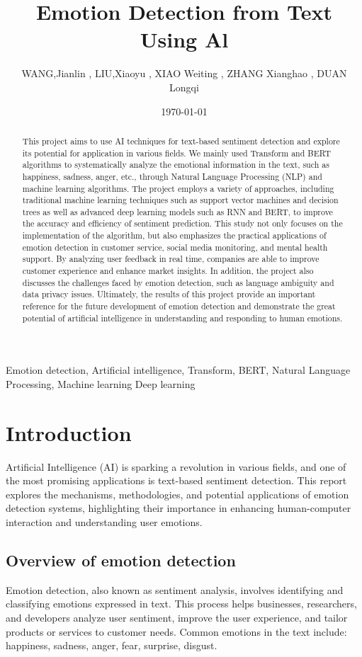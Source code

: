 \documentclass[journal]{IEEEtran}
\title{Emotion Detection from Text Using Al}
\author{WANG,Jianlin , LIU,Xiaoyu , XIAO Weiting , ZHANG Xianghao , DUAN Longqi }
\date{\today}
\begin{document}
\maketitle
\begin{abstract}
This project aims to use AI techniques for text-based sentiment detection and explore its potential for application in various fields. We mainly used Transform and BERT algorithms to systematically analyze the emotional information in the text, such as happiness, sadness, anger, etc., through Natural Language Processing (NLP) and machine learning algorithms. The project employs a variety of approaches, including traditional machine learning techniques such as support vector machines and decision trees as well as advanced deep learning models such as RNN and BERT, to improve the accuracy and efficiency of sentiment prediction.
This study not only focuses on the implementation of the algorithm, but also emphasizes the practical applications of emotion detection in customer service, social media monitoring, and mental health support. By analyzing user feedback in real time, companies are able to improve customer experience and enhance market insights. In addition, the project also discusses the challenges faced by emotion detection, such as language ambiguity and data privacy issues.
Ultimately, the results of this project provide an important reference for the future development of emotion detection and demonstrate the great potential of artificial intelligence in understanding and responding to human emotions.
\end{abstract}


\begin{IEEEkeywords}
Emotion detection, Artificial intelligence, Transform, BERT, Natural Language Processing, Machine learning Deep learning
\end{IEEEkeywords}  

\section{Introduction}

Artificial Intelligence (AI) is sparking a revolution in various fields, and one of the most promising applications is text-based sentiment detection. This report explores the mechanisms, methodologies, and potential applications of emotion detection systems, highlighting their importance in enhancing human-computer interaction and understanding user emotions.
\subsection{Overview of emotion detection}
Emotion detection, also known as sentiment analysis, involves identifying and classifying emotions expressed in text. This process helps businesses, researchers, and developers analyze user sentiment, improve the user experience, and tailor products or services to customer needs. Common emotions in the text include: happiness, sadness, anger, fear, surprise, disgust.
\end{document}
